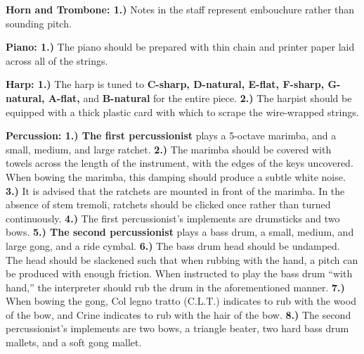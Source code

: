 \documentclass[11pt]{article}
\begin{document}
\begingroup
\begin{center}
\textbf{Horn and Trombone: 1.)} Notes in the staff represent embouchure rather than sounding pitch. \\
\rightskip\leftskip
\end{center}
\endgroup

\begingroup
\begin{center}
\textbf{Piano: 1.)} The piano should be prepared with thin chain and printer paper laid across all of the strings. \\
\rightskip\leftskip
\end{center}
\endgroup

\begingroup
\begin{center}
\textbf{Harp: 1.)} The harp is tuned to \textbf{C-sharp, D-natural, E-flat, F-sharp, G-natural, A-flat,} and \textbf{B-natural} for the entire piece. \textbf{2.)} The harpist should be equipped with a thick plastic card with which to scrape the wire-wrapped strings. \\
\rightskip\leftskip
\end{center}
\endgroup

\begingroup
\begin{center}
\textbf{Percussion: 1.) The first percussionist} plays a 5-octave marimba, and a small, medium, and large ratchet. \textbf{2.)} The marimba should be covered with towels across the length of the instrument, with the edges of the keys uncovered. When bowing the marimba, this damping should produce a subtle white noise. \textbf{3.)}  It is advised that the ratchets are mounted in front of the marimba. In the absence of stem tremoli, ratchets should be clicked once rather than turned continuously. \textbf{4.)} The first percussionist's implements are drumsticks and two bows. \textbf{5.) The second percussionist} plays a bass drum, a small, medium, and large gong, and a ride cymbal. \textbf{6.)} The bass drum head should be undamped. The head should be slackened such that when rubbing with the hand, a pitch can be produced with enough friction. When instructed to play the bass drum ``with hand,'' the interpreter should rub the drum in the aforementioned manner. \textbf{7.)} When bowing the gong, Col legno tratto (C.L.T.) indicates to rub with the wood of the bow, and Crine indicates to rub with the hair of the bow. \textbf{8.)} The second percussionist's implements are two bows, a triangle beater, two hard bass drum mallets, and a soft gong mallet. \\
\rightskip\leftskip
\end{center}
\endgroup
\end{document}
